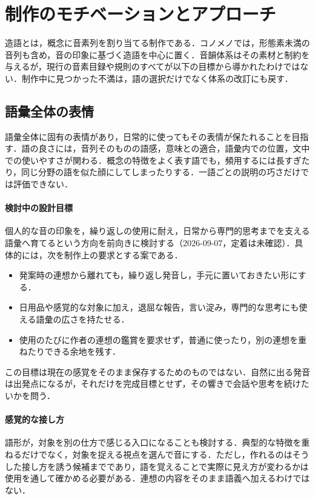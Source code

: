 \documentclass[../../main-detail.tex]{subfiles}
\begin{document}

\section{制作のモチベーションとアプローチ}
造語とは，概念に音素列を割り当てる制作である．コノメノでは，形態素未満の音列も含め，音の印象に基づく造語を中心に置く．音韻体系はその素材と制約を与えるが，現行の音素目録や規則のすべてが以下の目標から導かれたわけではない．制作中に見つかった不満は，語の選択だけでなく体系の改訂にも戻す．

\subsection{語彙全体の表情}
語彙全体に固有の表情があり，日常的に使ってもその表情が保たれることを目指す．語の良さには，音列そのものの語感，意味との適合，語彙内での位置，文中での使いやすさが関わる．概念の特徴をよく表す語でも，頻用するには長すぎたり，同じ分野の語を似た顔にしてしまったりする．一語ごとの説明の巧さだけでは評価できない．

\paragraph{検討中の設計目標} 個人的な音の印象を，繰り返しの使用に耐え，日常から専門的思考までを支える語彙へ育てるという方向を前向きに検討する（2026-09-07，定着は未確認）．具体的には，次を制作上の要求とする案である．
\begin{itemize}
    \item 発案時の連想から離れても，繰り返し発音し，手元に置いておきたい形にする．
    \item 日用品や感覚的な対象に加え，退屈な報告，言い淀み，専門的な思考にも使える語彙の広さを持たせる．
    \item 使用のたびに作者の連想の鑑賞を要求せず，普通に使ったり，別の連想を重ねたりできる余地を残す．
\end{itemize}
この目標は現在の感覚をそのまま保存するためのものではない．自然に出る発音は出発点になるが，それだけを完成目標とせず，その響きで会話や思考を続けたいかを問う．

\paragraph{感覚的な接し方} 語形が，対象を別の仕方で感じる入口になることも検討する．典型的な特徴を重ねるだけでなく，対象を捉える視点を選んで音にする．ただし，作れるのはそうした接し方を誘う候補までであり，語を覚えることで実際に見え方が変わるかは使用を通して確かめる必要がある．連想の内容をそのまま語義へ加えるわけではない．
\end{document}
